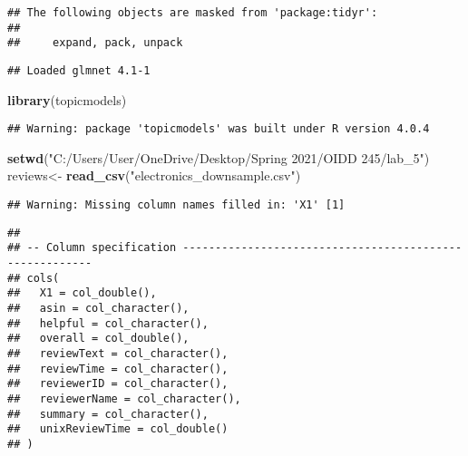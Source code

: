 \documentclass[
]{article}
\newenvironment{Shaded}{\begin{snugshade}}{\end{snugshade}}
\newcommand{\CharTok}[1]{\textcolor[rgb]{0.31,0.60,0.02}{#1}}
\newcommand{\DecValTok}[1]{\textcolor[rgb]{0.00,0.00,0.81}{#1}}
\newcommand{\KeywordTok}[1]{\textcolor[rgb]{0.13,0.29,0.53}{\textbf{#1}}}
\newcommand{\NormalTok}[1]{#1}
\newcommand{\OperatorTok}[1]{\textcolor[rgb]{0.81,0.36,0.00}{\textbf{#1}}}
\newcommand{\StringTok}[1]{\textcolor[rgb]{0.31,0.60,0.02}{#1}}
\begin{document}
\begin{verbatim}
## The following objects are masked from 'package:tidyr':
## 
##     expand, pack, unpack
\end{verbatim}

\begin{verbatim}
## Loaded glmnet 4.1-1
\end{verbatim}

\begin{Shaded}
\begin{Highlighting}[]
\KeywordTok{library}\NormalTok{(topicmodels)}
\end{Highlighting}
\end{Shaded}

\begin{verbatim}
## Warning: package 'topicmodels' was built under R version 4.0.4
\end{verbatim}

\begin{Shaded}
\begin{Highlighting}[]
\KeywordTok{setwd}\NormalTok{(}\StringTok{"C:/Users/User/OneDrive/Desktop/Spring 2021/OIDD 245/lab_5"}\NormalTok{)}
\NormalTok{reviews<-}\StringTok{ }\KeywordTok{read_csv}\NormalTok{(}\StringTok{"electronics_downsample.csv"}\NormalTok{)}
\end{Highlighting}
\end{Shaded}

\begin{verbatim}
## Warning: Missing column names filled in: 'X1' [1]
\end{verbatim}

\begin{verbatim}
## 
## -- Column specification --------------------------------------------------------
## cols(
##   X1 = col_double(),
##   asin = col_character(),
##   helpful = col_character(),
##   overall = col_double(),
##   reviewText = col_character(),
##   reviewTime = col_character(),
##   reviewerID = col_character(),
##   reviewerName = col_character(),
##   summary = col_character(),
##   unixReviewTime = col_double()
## )
\end{verbatim}

\begin{Shaded}
\end{Shaded}
\end{document}
